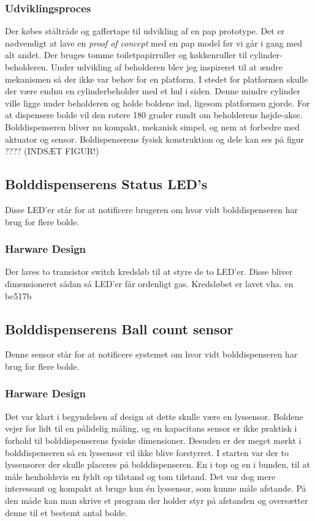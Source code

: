 \documentclass[HardwareDesign/HardwareDesign_main.tex]{subfiles}
\begin{document}
\subsubsection{Udviklingsproces}
Der købes ståltråde og gaffertape til udvikling af en pap prototype. Det er nødvendigt at lave en \textit{proof of concept} med en pap model før vi går i gang med alt andet. Der bruges tomme toiletpapirruller og køkkenruller til cylinder-beholderen. Under udvikling af beholderen blev jeg inspireret til at ændre mekanismen så der ikke var behov for en platform. I stedet for platformen skulle der være endnu en cylinderbeholder med et hul i siden. Denne mindre cylinder ville ligge under beholderen og holde boldene ind, ligesom platformen gjorde. For at dispensere bolde vil den rotere 180 grader rundt om beholderens højde-akse. Bolddispenseren bliver nu kompakt, mekanisk simpel, og nem at forbedre med aktuator og sensor. Boldispenserens fysisk konstruktion og dele kan ses på figur ????
(INDSÆT FIGUR!)
\subsection{Bolddispenserens Status LED's}
Disse LED'er står for at notificere brugeren om hvor vidt bolddispenseren har brug for flere bolde.
\subsubsection{Harware Design}
Der laves to transistor switch kredsløb til at styre de to LED'er. Disse bliver dimensioneret sådan så LED'er får ordenligt gas.
Kredsløbet er lavet vha. en bc517b
\subsection{Bolddispenserens Ball count sensor}
Denne sensor står for at notificere systemet om hvor vidt bolddispenseren har brug for flere bolde.
\subsubsection{Harware Design}
Det var klart i begyndelsen af design at dette skulle være en lyssensor. Boldene vejer for lidt til en pålidelig måling, og en kapacitans sensor er ikke praktisk i forhold til bolddispenserens fysiske dimensioner. Desuden er der meget mørkt i bolddispenseren så en lyssensor vil ikke blive forstyrret. I starten var der to lyssensorer der skulle placeres på bolddispenseren. En i top og en i bunden, til at måle henholdsvis en fyldt op tilstand og tom tilstand. Det var dog mere interessant og kompakt at bruge kun én lyssensor, som kunne måle afstande. På den måde kan man skrive et program der holder styr på afstanden og oversætter denne til et bestemt antal bolde.\\
\end{document}
